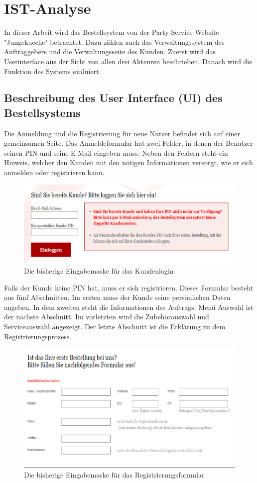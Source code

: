 \chapter{IST-Analyse}
In dieser Arbeit wird das Bestellsystem von der Party-Service-Website "Jungekueche" betrachtet. Dazu zählen auch das Verwaltungssystem des Auftraggebers und die Verwaltungsseite des Kunden. Zuerst wird das Userinterface aus der Sicht von allen drei Akteuren beschrieben. Danach wird die Funktion des Systems evaluiert.

\section{Beschreibung des User Interface (UI) des Bestellsystems} 

Die Anmeldung und die Registrierung für neue Nutzer befindet sich auf einer gemeinsamen Seite. 
Das Anmeldeformular hat zwei Felder, in denen der Benutzer seinen PIN und seine E-Mail eingeben muss. Neben den Feldern steht ein Hinweis, welcher den Kunden mit den nötigen Informationen versorgt, wie er sich anmelden oder registrieren kann.  


\begin{figure}[h]
	\centering
	\includegraphics[width=0.7\linewidth]{Graphics/anmeldeformular.png}
	\caption[Anmeldeformular]{Die bisherige Eingabemaske für das Kundenlogin}
	\label{fig:anmeldeformular}
\end{figure}

Falls der Kunde keine PIN hat, muss er sich registrieren. Dieses Formular besteht aus fünf Abschnitten. Im ersten muss der Kunde seine persönlichen Daten angeben. In dem zweiten steht die Informationen des Auftrags. Menü Auswahl ist der nächste Abschnitt. Im vorletzten wird die Zubehörauswahl und Serviceauswahl angezeigt. Der letzte Abschnitt ist die Erklärung zu dem Registrierungsprozess. 

\begin{figure}
	\centering
	\includegraphics[width=0.7\linewidth]{Graphics/registerForm.png}
	\caption[Registerformular]{Die bisherige Eingabemaske für das Registrierungsformular}
	\label{fig:registerForm}
\end{figure}

